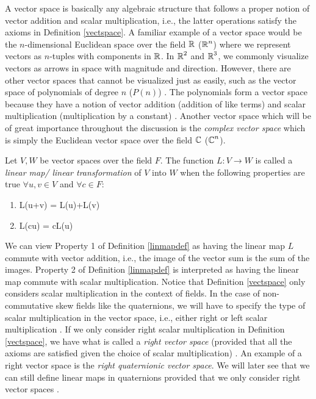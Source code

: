A vector space is basically any algebraic structure that follows a proper notion of vector addition and scalar multiplication, i.e., the latter operations satisfy the axioms in Definition \ref{vectspace}. A familiar example of a vector space would be the $n$-dimensional Euclidean space over the field $\operatorname{\mathbb{R}}$ ($\operatorname{\mathbb{R}}^n$) where we represent vectors as $n$-tuples with components in $\operatorname{\mathbb{R}}$. In $\operatorname{\mathbb{R}}^2$ and $\operatorname{\mathbb{R}}^3$, we commonly visualize vectors as arrows in space with magnitude and direction. However, there are other vector spaces that cannot be visualized just as easily, such as the vector space of polynomials of degree $n$ ($P(n)$) \cite{3b1b} \cite{larson}. The polynomials form a vector space because they have a notion of vector addition (addition of like terms) and scalar multiplication (multiplication by a constant) \cite{3b1b} \cite{larson}. Another vector space which will be of great importance throughout the discussion is the \emph{complex vector space} which is simply the Euclidean vector space over the field $\operatorname{\mathbb{C}}$ ($\operatorname{\mathbb{C}}^n$).

\begin{definition} \label{linmapdef}
	\emph{\cite{larson}} Let $V, W$ be vector spaces over the field $F$. The function $L: V \rightarrow W$ is called a \emph{linear map/ linear transformation} of $V$ into $W$ when the following properties are true $\forall u,v \in V$ and $\forall c \in F$:
	\newline\newline
	\begin{enumerate}
		\item L(u+v) = L(u)+L(v)
		\item L(cu) = cL(u)
	\end{enumerate}
\end{definition}

 We can view Property 1 of Definition \ref{linmapdef} as having the linear map $L$ commute with vector addition, i.e., the image of the vector sum is the sum of the images. Property 2 of Definition \ref{linmapdef} is interpreted as having the linear map commute with scalar multiplication. Notice that Definition \ref{vectspace} only considers scalar multiplication in the context of fields. In the case of non-commutative skew fields like the quaternions, we will have to specify the type of scalar multiplication in the vector space, i.e., either right or left scalar multiplication \cite{stack}. If we only consider right scalar multiplication in Definition \ref{vectspace}, we have what is called a \emph{right vector space} (provided that all the axioms are satisfied given the choice of scalar multiplication) \cite{stack}. An example of a right vector space is the \emph{right quaternionic vector space}. We will later see that we can still define linear maps in quaternions provided that we only consider right vector spaces \cite{stack} \cite{aslaksen}.

